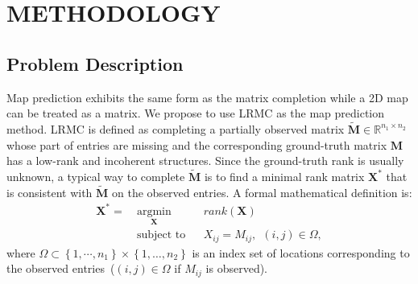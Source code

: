 \section{METHODOLOGY}
\label{sect:method}



\subsection{Problem Description}
Map prediction exhibits the same form as the matrix completion \cite{recht2009simpler} while a 2D map can be treated as a matrix. We propose to use LRMC as the map prediction method. LRMC is defined as completing a partially observed matrix $\tilde{\mathbf{M}}\in\mathbb{R}^{n_1\times n_2}$ whose part of entries are missing and the corresponding ground-truth matrix $\mathbf{M}$ has a low-rank and incoherent structures. Since the ground-truth rank is usually unknown, a typical way to complete $\tilde{\mathbf{M}}$ is to find a minimal rank matrix $\mathbf{X}^*$ that is consistent with $\tilde{\mathbf{M}}$ on the observed entries. A formal mathematical definition is:
\begin{equation}
    \label{eq:mc_1}
    \begin{aligned}
        \mathbf{X}^* = ~&\underset{\mathbf{X}}{\text{argmin}} 
               &&rank(\mathbf{X})\\
               &\text{subject to}
               && X_{ij} = M_{ij},~~\left ( i, j \right )\in \Omega,
    \end{aligned}
\end{equation}
where $\Omega \subset \left \{ 1, \cdots, n_1 \right \}\times \left \{ 1, \dots, n_2 \right \} $ is an index set of locations corresponding to the observed entries~($\left ( i, j \right )\in \Omega$ if $M_{ij}$ is observed). 

